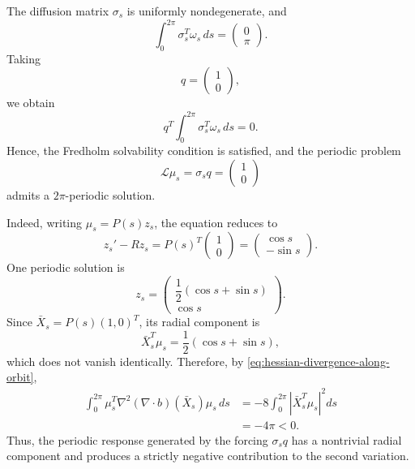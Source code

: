 \documentclass[preprint,12pt]{elsarticle}
\theoremstyle{definition}
\theoremstyle{plain}
\begin{document}
The diffusion matrix $\sigma_s$ is uniformly nondegenerate, and
\begin{equation*}
    \int_0^{2\pi}\sigma_s^T\omega_s\,ds
    =
    \begin{pmatrix}
        0\\
        \pi
    \end{pmatrix}.
\end{equation*}
Taking
\begin{equation*}
    q
    =
    \begin{pmatrix}
        1\\
        0
    \end{pmatrix},
\end{equation*}
we obtain
\begin{equation*}
    q^T
    \int_0^{2\pi}\sigma_s^T\omega_s\,ds
    =
    0.
\end{equation*}
Hence, the Fredholm solvability condition is satisfied, and the periodic problem
\begin{equation*}
    \mathcal L\mu_s
    =
    \sigma_s q
    =
    \begin{pmatrix}
        1\\
        0
    \end{pmatrix}
\end{equation*}
admits a $2\pi$-periodic solution.

Indeed, writing $\mu_s=P(s)z_s$, the equation reduces to
\begin{equation*}
    z_s'-Rz_s
    =
    P(s)^T
    \begin{pmatrix}
        1\\
        0
    \end{pmatrix}
    =
    \begin{pmatrix}
        \cos s\\
        -\sin s
    \end{pmatrix}.
\end{equation*}
One periodic solution is
\begin{equation*}
    z_s
    =
    \begin{pmatrix}
        \dfrac{1}{2}(\cos s+\sin s)\\[1mm]
        \cos s
    \end{pmatrix}.
\end{equation*}
Since $\bar X_s=P(s)(1,0)^T$, its radial component is
\begin{equation*}
    \bar X_s^T\mu_s
    =
    \frac{1}{2}(\cos s+\sin s),
\end{equation*}
which does not vanish identically. Therefore, by
\eqref{eq:hessian-divergence-along-orbit},
\begin{equation*}
\begin{aligned}
    \int_0^{2\pi}
    \mu_s^T
    \nabla^2(\nabla\cdot b)(\bar X_s)
    \mu_s\,ds
    &=
    -8
    \int_0^{2\pi}
    \left|
        \bar X_s^T\mu_s
    \right|^2
    ds\\
    &=
    -4\pi
    <0.
\end{aligned}
\end{equation*}
Thus, the periodic response generated by the forcing $\sigma_s q$ has a
nontrivial radial component and produces a strictly negative contribution to
the second variation.
\end{document}
